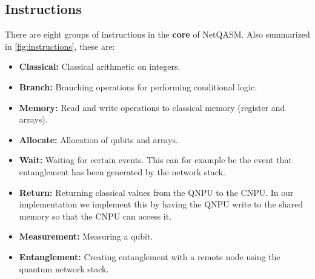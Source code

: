 \subsection{Instructions}
\label{netqasm:sec:instructions}
There are eight groups of instructions in the \textbf{core} of \ac{NetQASM}.
Also summarized in \cref{fig:instructions}, these are:
\begin{itemize}
      \item \textbf{Classical:} Classical arithmetic on integers.
      \item \textbf{Branch:} Branching operations for performing conditional logic.
      \item \textbf{Memory:} Read and write operations to classical memory (register and arrays).
      \item \textbf{Allocate:} Allocation of qubits and arrays.
      \item \textbf{Wait:} Waiting for certain events. This can for example be the event that entanglement has been generated by the network stack.
      \item \textbf{Return:} Returning classical values from the \ac{QNPU} to the \ac{CNPU}.
            In our implementation we implement this by having the \ac{QNPU} write to the shared memory so that the \ac{CNPU} can access it.
      \item \textbf{Measurement:} Measuring a qubit.
      \item \textbf{Entanglement:} Creating entanglement with a remote node using the quantum network stack.
\end{itemize}

